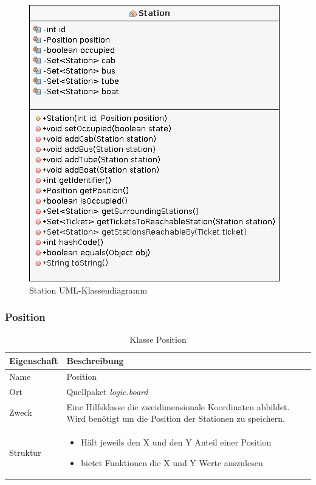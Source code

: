            \begin{figure}[H]
                \centering
                \includegraphics[scale=0.7]{img/uml/station.png}   
                \caption{Station UML-Klassendiagramm}
            \end{figure}



        \subsubsection{Position}
            \begin{table}[H]
                \caption{Klasse Position}
                \begin{tabular}{p{2.5cm}  p{9.5cm}} 
                    \hline
                    \textbf{Eigenschaft} & \textbf{Beschreibung}\\
                    \hline
                    Name & Position\\
                    Ort & Quellpaket \textit{logic.board}\\
                    \hline
                    Zweck &
                    Eine Hilfsklasse die zweidimensionale Koordinaten abbildet.
                    Wird benötigt um die Position der Stationen zu speichern.
                    \\
                    \hline
                    Struktur &
                    \begin{itemize}
                        \itemsep0em
                        \item Hält jeweils den X und den Y Anteil einer Position
                        \item bietet Funktionen die X und Y Werte auszulesen
                    \end{itemize}
                    \\
                    \hline
                \end{tabular}
            \end{table}

